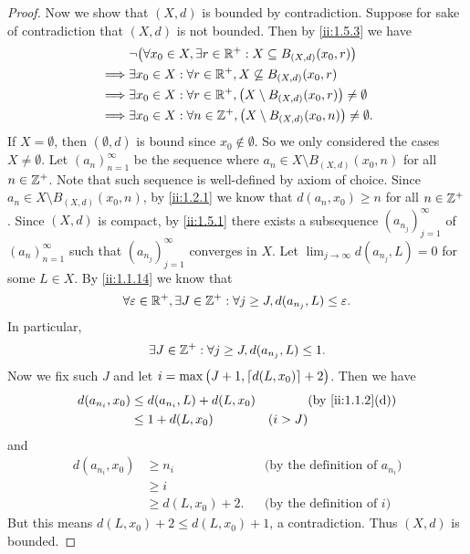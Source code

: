\begin{proof}
  Now we show that \((X, d)\) is bounded by contradiction.
  Suppose for sake of contradiction that \((X, d)\) is not bounded.
  Then by \cref{ii:1.5.3} we have
  \begin{align*}
             & \lnot\big(\forall x_0 \in X, \exists r \in \mathbb{R}^+ : X \subseteq B_{(X, d)}(x_0, r)\big)            \\
    \implies & \exists x_0 \in X : \forall r \in \mathbb{R}^+, X \not\subseteq B_{(X, d)}(x_0, r)                       \\
    \implies & \exists x_0 \in X : \forall r \in \mathbb{R}^+, \big(X \setminus B_{(X, d)}(x_0, r)\big) \neq \emptyset  \\
    \implies & \exists x_0 \in X : \forall n \in \mathbb{Z}^+, \big(X \setminus B_{(X, d)}(x_0, n)\big) \neq \emptyset.
  \end{align*}
  If \(X = \emptyset\), then \((\emptyset, d)\) is bound since \(x_0 \notin \emptyset\).
  So we only considered the cases \(X \neq \emptyset\).
  Let \((a_n)_{n = 1}^\infty\) be the sequence where \(a_n \in X \setminus B_{(X, d)}(x_0, n)\) for all \(n \in \mathbb{Z}^+\).
  Note that such sequence is well-defined by axiom of choice.
  Since \(a_n \in X \setminus B_{(X, d)}(x_0, n)\), by \cref{ii:1.2.1} we know that \(d(a_n, x_0) \geq n\) for all \(n \in \mathbb{Z}^+\).
  Since \((X, d)\) is compact, by \cref{ii:1.5.1} there exists a subsequence \((a_{n_j})_{j = 1}^\infty\) of \((a_n)_{n = 1}^\infty\) such that \((a_{n_j})_{j = 1}^\infty\) converges in \(X\).
  Let \(\lim_{j \to \infty} d(a_{n_j}, L) = 0\) for some \(L \in X\).
  By \cref{ii:1.1.14} we know that
  \[
    \forall \varepsilon \in \mathbb{R}^+, \exists J \in \mathbb{Z}^+ : \forall j \geq J, d(a_{n_j}, L) \leq \varepsilon.
  \]
  In particular,
  \[
    \exists J \in \mathbb{Z}^+ : \forall j \geq J, d(a_{n_j}, L) \leq 1.
  \]
  Now we fix such \(J\) and let \(i = \max\big(J + 1, \left\lceil d(L, x_0)\right\rceil + 2\big)\).
  Then we have
  \begin{align*}
    d(a_{n_i}, x_0) & \leq d(a_{n_i}, L) + d(L, x_0) &         & \by{ii:1.1.2}[d] \\
                    & \leq 1 + d(L, x_0)             & (i > J)
  \end{align*}
  and
  \begin{align*}
    d(a_{n_i}, x_0) & \geq n_i            &  & \text{(by the definition of \(a_{n_i}\))} \\
                    & \geq i                                                             \\
                    & \geq d(L, x_0) + 2. &  & \text{(by the definition of \(i\))}
  \end{align*}
  But this means \(d(L, x_0) + 2 \leq d(L, x_0) + 1\), a contradiction.
  Thus \((X, d)\) is bounded.
\end{proof}

